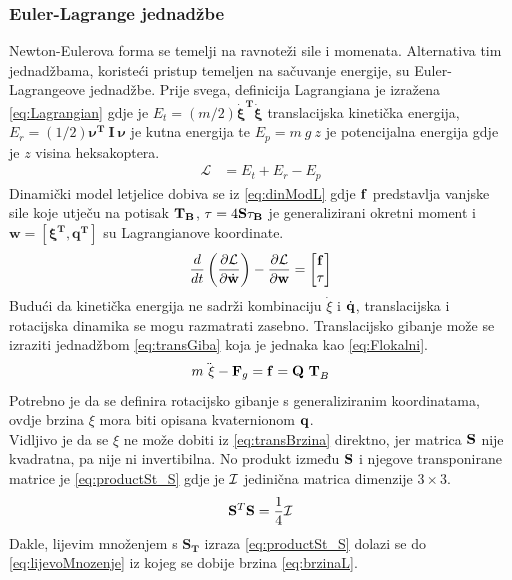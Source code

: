 \documentclass[times, utf8, diplomski]{fer}
\begin{document}
\subsubsection{Euler-Lagrange jednadžbe}
Newton-Eulerova forma se temelji na ravnoteži sile i momenata. Alternativa tim jednadžbama, koristeći pristup temeljen na sačuvanje energije, su Euler-Lagrangeove jednadžbe. Prije svega, definicija Lagrangiana je izražena \ref{eq:Lagrangian} gdje je $E_t = (m/2)\mathbf{\dot{\xi}^T\dot{\xi}}$ translacijska kinetička energija, $E_r = (1/2)\mathbf{\nu^T~I~\nu}$ je kutna energija te $E_p=m~g~z$ je potencijalna energija gdje je $z$ visina heksakoptera.
\begin{align}
\mathcal{L}&=E_t+E_r-E_p \label{eq:Lagrangian}
\end{align}
Dinamički model letjelice dobiva se iz \ref{eq:dinModL} gdje $\bf f$ predstavlja vanjske sile koje utječu na potisak $\bf T_B$, $\tau=4\bf {S \tau_B}$ je generalizirani okretni moment i $\mathbf{w=\left[ \xi^T, q^T \right]}$ su Lagrangianove koordinate.
\begin{equation}
{d\over dt}\left({\partial {\cal L}\over \partial\dot{{\bf w}}}\right)-{\partial {\cal L}\over \partial{\bf w}}= \begin{bmatrix}\bf f \\ \bf\tau \end{bmatrix} \label{eq:dinModL}
\end{equation}
Budući da kinetička energija ne sadrži kombinaciju $\dot{\xi}$ i $\dot{\bf q}$, translacijska i rotacijska dinamika se mogu razmatrati zasebno. Translacijsko gibanje može se izraziti jednadžbom \ref{eq:transGiba} koja je jednaka kao \ref{eq:Flokalni}.
\begin{equation}
m\ddot{{\ \xi}}-{\bf F}_{g}={\bf f}={\bf Q\ T}_{B} \label{eq:transGiba}
\end{equation}
Potrebno je da se definira rotacijsko gibanje s generaliziranim koordinatama, ovdje brzina $\xi$ mora biti opisana kvaternionom $\bf q$.\\
Vidljivo je da se $\xi$ ne može dobiti iz \ref{eq:transBrzina} direktno, jer matrica $\bf S$ nije kvadratna, pa nije ni invertibilna. No produkt između $\bf S$ i njegove transponirane matrice je \ref{eq:productSt_S} gdje je $\cal I$ jedinična matrica dimenzije $3\times3$. 
\begin{equation}
{\bf S}^{T}{\bf S}={1\over 4}{\cal I} \label{eq:productSt_S}
\end{equation}
Dakle, lijevim množenjem s $\mathbf{S_T}$ izraza \ref{eq:productSt_S} dolazi se do \ref{eq:lijevoMnozenje} iz kojeg se dobije brzina \ref{eq:brzinaL}.
\end{document}
